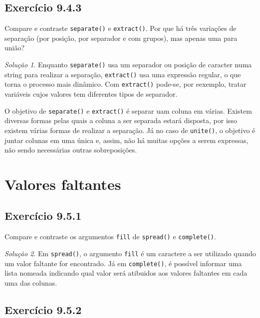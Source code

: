 \documentclass[
]{latex/krantz}
\theoremstyle{definition}
\theoremstyle{definition}
\theoremstyle{definition}
\theoremstyle{definition}
\theoremstyle{remark}
\newtheorem*{solution}{Solução}
\begin{document}
\hypertarget{exr9-4-3}{%
\subsection*{Exercício 9.4.3}\label{exr9-4-3}}

Compare e contraste \texttt{separate()} e \texttt{extract()}. Por que há três variações de separação (por posição, por separador e com grupos), mas apenas uma para união?

\begin{solution}
Enquanto \texttt{separate()} usa um separador ou posição de caracter numa string para realizar a separação, \texttt{extract()} usa uma expressão regular, o que torna o processo mais dinâmico. Com \texttt{extract()} pode-se, por eexemplo, tratar variáveis cujos valores tem diferentes tipos de separador.

O objetivo de \texttt{separate()} e \texttt{extract()} é separar uam coluna em várias. Existem diversas formas pelas quais a coluna a ser separada estará disposta, por isso existem várias formas de realizar a separação. Já no caso de \texttt{unite()}, o objetivo é juntar colunas em uma única e, assim, não há muitas opções a serem expressas, não sendo necessárias outras sobreposições.
\end{solution}

\hypertarget{valores-faltantes-1}{%
\section{Valores faltantes}\label{valores-faltantes-1}}

\hypertarget{exr9-5-1}{%
\subsection*{Exercício 9.5.1}\label{exr9-5-1}}

Compare e contraste os argumentos \texttt{fill} de \texttt{spread()} e \texttt{complete()}.

\begin{solution}
Em \texttt{spread()}, o argumento \texttt{fill} é um caractere a ser utilizado quando um valor faltante for encontrado. Já em \texttt{complete()}, é possível informar uma lista nomeada indicando qual valor será atibuidos aos valores faltantes em cada uma das colunas.
\end{solution}

\hypertarget{exr9-5-2}{%
\subsection*{Exercício 9.5.2}\label{exr9-5-2}}
\end{document}
